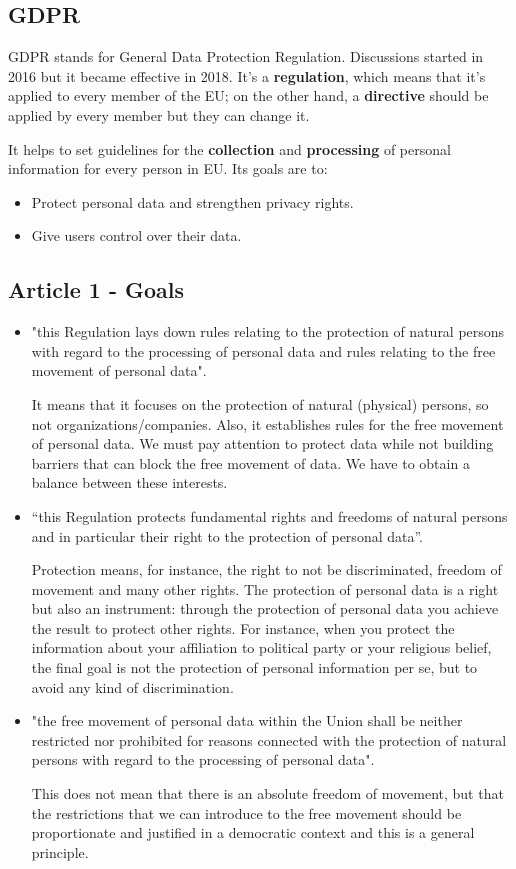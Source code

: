 \subsection{GDPR}
GDPR stands for General Data Protection Regulation. Discussions started in 2016 but it became effective in 2018. It's a \textbf{regulation}, which means that it's applied to every member of the EU; on the other hand, a \textbf{directive} should be applied by every member but they can change it.

It helps to set guidelines for the \textbf{collection} and \textbf{processing} of personal information for every person in EU. Its goals are to:
\begin{itemize}
    \item Protect personal data and strengthen privacy rights.
    \item Give users control over their data.
\end{itemize}

\subsection{Article 1 - Goals}
\begin{itemize}
    \item "this Regulation lays down rules relating to the protection of natural persons with regard to the processing of personal data and rules relating to the free movement of personal data". 
    
    It means that it focuses on the protection of natural (physical) persons, so not organizations/companies. Also, it establishes rules for the free movement of personal data. We must pay attention to protect data while not building barriers that can block the free movement of data. We have to obtain a balance between these interests.
    \item “this Regulation protects fundamental rights and freedoms of natural persons and in particular their right to the protection of personal data”. 
    
    Protection means, for instance, the right to not be discriminated, freedom of movement and many other rights. The protection of personal data is a right but also an instrument: through the protection of personal data you achieve the result to protect other rights. For instance, when you protect the information about your affiliation to political party or your religious belief, the final goal is not the protection of personal information per se, but to avoid any kind of discrimination.
    \item "the free movement of personal data within the Union shall be neither restricted nor prohibited for reasons connected with the protection of natural persons with regard to the processing of personal data". 
    
    This does not mean that there is an absolute freedom of movement, but that the restrictions that we can introduce to the free movement should be proportionate and justified in a democratic context and this is a general principle.
\end{itemize}
